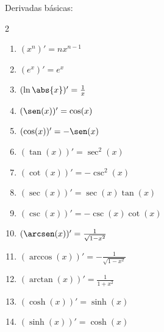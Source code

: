 \documentclass{article}
\begin{document}
{\large Derivadas básicas:}
\begin{multicols}{2}
  \begin{enumerate}
    \item $(x^n)' = nx^{n-1}$
    \item $(e^x)' = e^x$
    \item $(\ln\abs{x})' = \frac{1}{x}$
    \item $(\sen(x))' = \cos(x)$
    \item $(\cos(x))' = -\sen(x)$
    \item $(\tan(x))' = \sec^2(x)$
    \item $(\cot(x))' = -\csc^2(x)$
    \item $(\sec(x))' = \sec(x)\tan(x)$
    \item $(\csc(x))' = -\csc(x)\cot(x)$
    \item $(\arcsen(x))' = \frac{1}{\sqrt{1-x^2}}$
    \item $(\arccos(x))' = -\frac{1}{\sqrt{1-x^2}}$
    \item $(\arctan(x))' = \frac{1}{1+x^2}$
    \item $(\cosh(x))' = \sinh(x)$
    \item $(\sinh(x))' = \cosh(x)$
  \end{enumerate}
\end{multicols}
\vspace{5mm}

\end{document}
